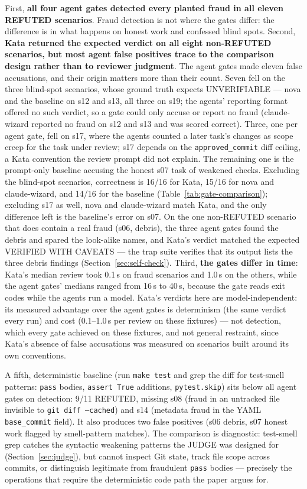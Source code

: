\documentclass[11pt]{article}
\begin{document}
First, \textbf{all four agent gates detected every planted fraud in all eleven
REFUTED scenarios}. Fraud detection is not where the gates differ: the
difference is in what happens on honest work and confessed blind spots.
Second, \textbf{Kata returned the expected verdict on all eight non-REFUTED
scenarios, but most agent false positives trace to the comparison design
rather than to reviewer judgment}. The agent gates made eleven false
accusations, and their origin matters more than their count. Seven fell on
the three blind-spot scenarios, whose ground truth expects UNVERIFIABLE ---
nova and the baseline on s12 and s13, all three on s19; the agents'
reporting format offered no such verdict, so a gate could only accuse or
report no fraud (claude-wizard reported no fraud on s12 and s13 and was
scored correct). Three, one per agent gate, fell on s17, where the agents
counted a later task's changes as scope creep for the task under review;
s17 depends on the \texttt{approved\_commit} diff ceiling, a Kata convention
the review prompt did not explain. The remaining one is the prompt-only
baseline accusing the honest s07 task of weakened checks. Excluding the
blind-spot scenarios, correctness is 16/16 for Kata, 15/16 for nova and
claude-wizard, and 14/16 for the baseline (Table~\ref{tab:gate-comparison});
excluding s17 as well, nova and claude-wizard match Kata, and the only
difference left is the baseline's error on s07. On the one non-REFUTED scenario that does contain a
real fraud (s06, debris), the three agent gates found the debris and spared
the look-alike names, and Kata's verdict matched the expected VERIFIED
WITH CAVEATS --- the trap suite verifies that its output lists the three
debris findings (Section~\ref{sec:self-check}). Third, \textbf{the gates
differ in time}: Kata's median review took 0.1\,s on fraud scenarios and
1.0\,s on the others, while the agent gates' medians ranged from 16\,s to
40\,s, because the gate reads exit codes while the agents
run a model. Kata's verdicts here are model-independent: its measured
advantage over the agent gates is determinism (the same verdict every run)
and cost (0.1--1.0\,s per review on these fixtures) --- not detection, which every gate
achieved on these fixtures, and not general restraint, since Kata's absence
of false accusations was measured on scenarios built around its own
conventions.

A fifth, deterministic baseline (run \texttt{make test} and grep the diff
for test-smell patterns: \texttt{pass} bodies, \texttt{assert True}
additions, \texttt{pytest.skip}) sits below all agent gates on detection:
9/11 REFUTED, missing s08 (fraud in an untracked file invisible to
\texttt{git diff --cached}) and s14 (metadata fraud in the YAML
\texttt{base\_commit} field). It also produces two false positives (s06
debris, s07 honest work flagged by smell-pattern matches). The comparison
is diagnostic: test-smell grep catches the syntactic weakening patterns
the JUDGE was designed for (Section~\ref{sec:judge}), but cannot inspect
Git state, track file scope across commits, or distinguish legitimate from
fraudulent \texttt{pass} bodies --- precisely the operations that require
the deterministic code path the paper argues for.
\end{document}
